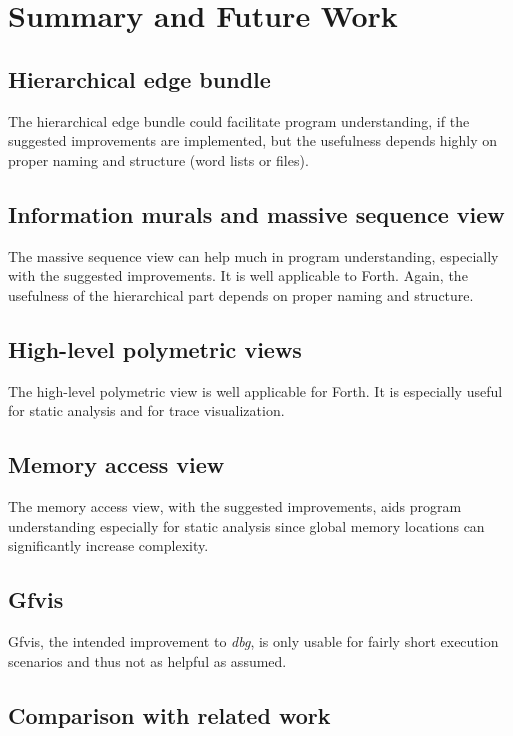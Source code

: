 \chapter{Summary and Future Work}
\label{chap:Summary}

\section*{Hierarchical edge bundle}
The hierarchical edge bundle could facilitate program understanding, if the suggested improvements are implemented, but the usefulness depends highly on proper naming and structure (word lists or files).

\section*{Information murals and massive sequence view}
The massive sequence view can help much in program understanding, especially with the suggested improvements. It is well applicable to Forth. Again, the usefulness of the hierarchical part depends on proper naming and structure.

\section*{High-level polymetric views}

The high-level polymetric view is well applicable for Forth. It is especially useful for static analysis and for trace visualization.

\section*{Memory access view}

The memory access view, with the suggested improvements, aids program understanding especially for static analysis since global memory locations can significantly increase complexity.

\section*{Gfvis}

Gfvis, the intended improvement to \emph{dbg}, is only usable for fairly short execution scenarios and thus not as helpful as assumed.

\section{Comparison with related work}

